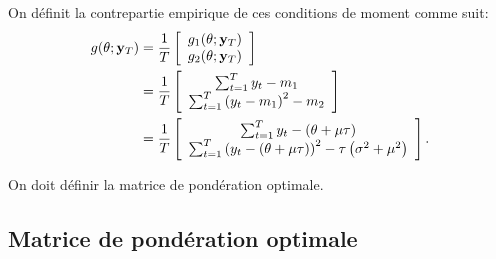 On définit la contrepartie empirique de ces conditions de moment
comme suit:
\begin{align}
  g(\theta;\mathbf{y}_T) &= \frac{1}{T} \left[\begin{array}[]{c}
      g_1(\theta;\mathbf{y}_T)\\
      g_2(\theta;\mathbf{y}_T)
    \end{array}\right] \nonumber\\
  &= \frac{1}{T} \left[\begin{array}[]{c}
      \sum_{t=1}^T y_t - m_1 \\
      \sum_{t=1}^T \left(y_t - m_1 \right)^2 - m_2
    \end{array}\right] \label{eq:condmomEMP}\\
  &= \frac{1}{T} \left[\begin{array}[]{c}
      \sum_{t=1}^Ty_t - \left(\theta+\mu\tau\right) \\
      \sum_{t=1}^T\left(y_t - \left(\theta+\mu\tau\right) \right)^2 -
      \tau\left(\sigma^2+\mu^2\right)
    \end{array}\right]. \label{eq:condmomEMPGAL}
\end{align}

On doit définir la matrice de pondération optimale.

\subsection{Matrice de pondération optimale}

